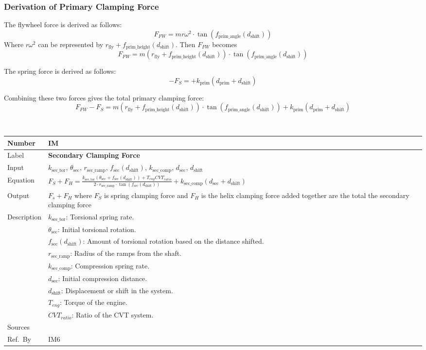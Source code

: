 \documentclass[12pt]{article}
\newcommand{\colAwidth}{0.13\textwidth}
\newcommand{\colBwidth}{0.82\textwidth}
\newcounter{instnum} %
\newcommand{\definstance}[7] {
~\newline
\noindent
\begin{minipage}{\textwidth}
\renewcommand*{\arraystretch}{1.5}
\begin{tabular}{| p{\colAwidth} | p{\colBwidth}|}
  \hline
  \rowcolor[gray]{0.9}
  Number& IM\refstepcounter{instnum}\theinstnum \label{inst:\theinstnum}\\
  \hline
  Label& \bf #1 \\
  \hline
  Input& #2\\
  \hline
  Equation& #3\\
  \hline
  Output& #4\\
  \hline
  Description& #5 \\
  \hline
  Sources& #6 \\
  \hline
  Ref.\ By & #7\\
  \hline
\end{tabular}
\end{minipage}\\
}
\begin{document}
\subsubsection*{Derivation of Primary Clamping Force}

The flywheel force is derived as follows: 
\[
F_{FW} = m r \omega^2 \cdot \tan(f_{\text{prim\_angle}}(d_{\text{shift}}))
\]
Where \( r \omega^2 \) can be represented by \( r_{\text{fly}} + f_{\text{prim\_height}}(d_{\text{shift}}) \). Then \( F_{FW} \) becomes 
\[
F_{FW} = m (r_{\text{fly}} + f_{\text{prim\_height}}(d_{\text{shift}})) \cdot \tan(f_{\text{prim\_angle}}(d_{\text{shift}}))
\]

The spring force is derived as follows: 
\[
-F_S = + k_{\text{prim}} (d_{\text{prim}} + d_{\text{shift}})
\]

Combining these two forces gives the total primary clamping force:
\[
F_{FW} - F_S = m (r_{\text{fly}} + f_{\text{prim\_height}}(d_{\text{shift}})) \cdot \tan(f_{\text{prim\_angle}}(d_{\text{shift}})) + k_{\text{prim}} (d_{\text{prim}} + d_{\text{shift}})
\]

\definstance
{Secondary Clamping Force}
{$k_{\text{sec\_tor}}$, $\theta_{\text{sec}}$, $r_{\text{sec\_ramp}}$, $f_{\text{sec}}(d_{\text{shift}})$, $k_{\text{sec\_comp}}$, $d_{\text{sec}}$, $d_{\text{shift}}$} %
{$F_S + F_H = \frac{k_{\text{sec\_tor}} (\theta_{\text{sec}} + f_{\text{sec}}(d_{\text{shift}})) + T_{eng} CVT_{ratio}}{2 \cdot r_{\text{sec\_ramp}} \cdot \tan(f_{\text{sec}}(d_{\text{shift}}))} + k_{\text{sec\_comp}} (d_{\text{sec}} + d_{\text{shift}})$} %
{$F_s + F_H$ where $F_S$ is spring clamping force and $F_H$ is the helix clamping force added together are the total the secondary clamping force } %
{$k_{\text{sec\_tor}}$: Torsional spring rate. \\
  &$\theta_{\text{sec}}$: Initial torsional rotation. \\
  &$f_{\text{sec}}(d_{\text{shift}})$: Amount of torsional rotation based on the distance shifted. \\
  &$r_{\text{sec\_ramp}}$: Radius of the ramps from the shaft. \\
  &$k_{\text{sec\_comp}}$: Compression spring rate. \\
  &$d_{\text{sec}}$: Initial compression distance. \\
  &$d_{\text{shift}}$: Displacement or shift in the system. \\
  &$T_{eng}$: Torque of the engine. \\
  &$CVT_{ratio}$: Ratio of the CVT system.
} %
{} %
{IM6}
\end{document}
